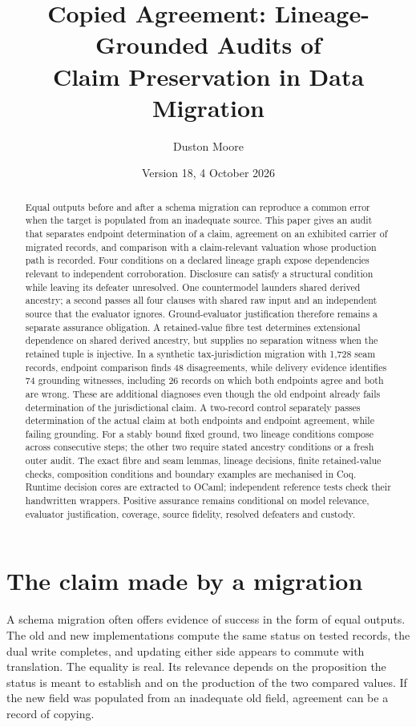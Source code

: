 \documentclass[11pt]{article}
\title{Copied Agreement: Lineage-Grounded Audits of\\ Claim Preservation in Data Migration}
\author{Duston Moore}
\date{Version 18, 4 October 2026}
\theoremstyle{definition}
\begin{document}
\maketitle
\begin{abstract}
Equal outputs before and after a schema migration can reproduce a common error when the target is populated from an inadequate source. This paper gives an audit that separates endpoint determination of a claim, agreement on an exhibited carrier of migrated records, and comparison with a claim-relevant valuation whose production path is recorded. Four conditions on a declared lineage graph expose dependencies relevant to independent corroboration. Disclosure can satisfy a structural condition while leaving its defeater unresolved. One countermodel launders shared derived ancestry; a second passes all four clauses with shared raw input and an independent source that the evaluator ignores. Ground-evaluator justification therefore remains a separate assurance obligation. A retained-value fibre test determines extensional dependence on shared derived ancestry, but supplies no separation witness when the retained tuple is injective. In a synthetic tax-jurisdiction migration with 1,728 seam records, endpoint comparison finds 48 disagreements, while delivery evidence identifies 74 grounding witnesses, including 26 records on which both endpoints agree and both are wrong. These are additional diagnoses even though the old endpoint already fails determination of the jurisdictional claim. A two-record control separately passes determination of the actual claim at both endpoints and endpoint agreement, while failing grounding. For a stably bound fixed ground, two lineage conditions compose across consecutive steps; the other two require stated ancestry conditions or a fresh outer audit. The exact fibre and seam lemmas, lineage decisions, finite retained-value checks, composition conditions and boundary examples are mechanised in Coq. Runtime decision cores are extracted to OCaml; independent reference tests check their handwritten wrappers. Positive assurance remains conditional on model relevance, evaluator justification, coverage, source fidelity, resolved defeaters and custody.
\end{abstract}

\section{The claim made by a migration}\label{ex:sec:intro}
A schema migration often offers evidence of success in the form of equal outputs. The old and new implementations compute the same status on tested records, the dual write completes, and updating either side appears to commute with translation. The equality is real. Its relevance depends on the proposition the status is meant to establish and on the production of the two compared values. If the new field was populated from an inadequate old field, agreement can be a record of copying.
\end{document}
